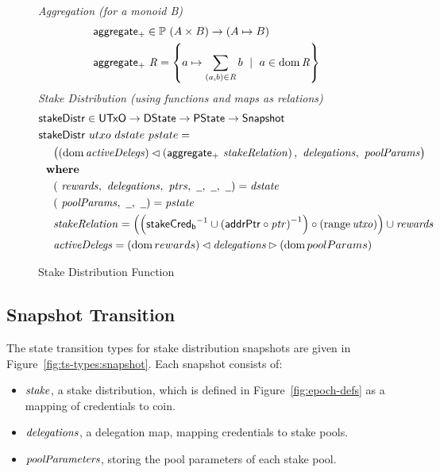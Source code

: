 \begin{figure}[htb]
  \emph{Aggregation (for a monoid B)}
  \begin{align*}
      & \mathsf{aggregate_{+}} \in \mathbb{P}~(A \times B) \to (A\mapsto B) \\
      & \mathsf{aggregate_{+}}~\mathit{R} = \left\{a\mapsto \sum_{(a,b)\in\mathit{R}}b
          ~\mid~a\in\operatorname{dom}\mathit{R}\right\} \\
  \end{align*}
  \emph{Stake Distribution (using functions and maps as relations)}
  \begin{align*}
      & \fun{stakeDistr} \in \UTxO \to \DState \to \PState \to \Snapshot \\
      & \fun{stakeDistr}~{utxo}~{dstate}~{pstate} = \\
      & ~~~~ \big((\dom{\var{activeDelegs}})
      \restrictdom\left(\fun{aggregate_{+}}~\var{stakeRelation}\right),
    ~\var{delegations},~\var{poolParams}\big)\\
      & \where \\
      & ~~~~ (~\var{rewards},~\var{delegations},~\var{ptrs},~\wcard,~\wcard,~\wcard)
        = \var{dstate} \\
      & ~~~~ (~\var{poolParams},~\wcard,~\wcard) = \var{pstate} \\
      & ~~~~ \var{stakeRelation} = \left(
        \left(\fun{stakeCred_b}^{-1}\cup\left(\fun{addrPtr}\circ\var{ptr}\right)^{-1}\right)
        \circ\left(\range{\var{utxo}}\right)
        \right)
        \cup \var{rewards} \\
      & ~~~~ \var{activeDelegs} =
               (\dom{rewards}) \restrictdom \var{delegations} \restrictrange (\dom{poolParams}) \\
  \end{align*}

  \caption{Stake Distribution Function}
  \label{fig:functions:stake-distribution}
\end{figure}

\clearpage

\subsection{Snapshot Transition}
\label{sec:snapshots}

The state transition types for stake distribution snapshots are given in
Figure~\ref{fig:ts-types:snapshot}.
Each snapshot consists of:
\begin{itemize}
  \item $\mathit{stake}$, a stake distribution, which is defined in
    Figure~\ref{fig:epoch-defs} as a mapping of credentials to coin.
  \item $\mathit{delegations}$, a delegation map, mapping credentials to stake pools.
  \item $\mathit{poolParameters}$, storing the pool parameters of each stake pool.
\end{itemize}

